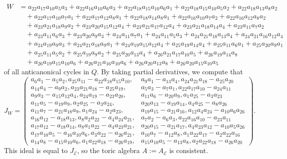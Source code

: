 \documentclass[11pt,a4paper]{amsart}
\numberwithin{equation}{section}
\theoremstyle{definition}
\theoremstyle{remark}
\begin{document}
\begin{align*}
W&=a_{22}a_{17}a_{10}a_{5}a_3 + a_{22}a_{16}a_{10}a_{6}a_3 +a_{22}a_{18}a_{15}a_{10}a_6a_1+a_{22}a_{18}a_{15}a_{10}a_5a_2+ a_{22}a_{18}a_{13}a_{8}a_2 \\
& \quad+a_{22}a_{17}a_{10}a_{7}a_{1} + a_{22}a_{17}a_{12}a_{8}a_1 +a_{22}a_{18}a_{14}a_{8}a_1 + a_{22}a_{16}a_{10}a_{7}a_2 +a_{22}a_{16}a_{12}a_{8}a_2  \\ 
& \quad+ a_{23}a_{21}a_{18}a_{9}a_2 + a_{23}a_{20}a_{15}a_{12}a_4+ a_{23}a_{21}a_{17}a_{12}a_4 + a_{23}a_{21}a_{18}a_{14}a_4 + a_{23}a_{11}a_{7}a_{2} \\
& \quad+ a_{23}a_{11}a_{6}a_{3} + a_{23}a_{20}a_{9}a_{3}  + a_{24}a_{11}a_{7}a_{1} +a_{24}a_{11}a_{5}a_{3}+a_{24}a_{21}a_{18}a_{13}a_4  +a_{24}a_{21}a_{16}a_{12}a_4 \\ 
&  \quad + a_{24}a_{19}a_{9}a_{3} + a_{24}a_{21}a_{18}a_{9}a_1 + a_{24}a_{19}a_{15}a_{12}a_4+ a_{25}a_{19}a_{14}a_{4} + a_{25}a_{11}a_{6}a_{1} + a_{25}a_{20}a_{9}a_{1}  \\
 & \quad  + a_{25}a_{11}a_{5}a_{2} + a_{25}a_{19}a_{9}a_{2} + a_{25}a_{20}a_{13}a_{4} + a_{26}a_{21}a_{17}a_{10}a_5 + a_{26}a_{19}a_{14}a_{8}  \\
& \quad + a_{26}a_{19}a_{15}a_{10}a_6 + a_{26}a_{21}a_{16}a_{10}a_6 + a_{26}a_{20}a_{13}a_{8} + a_{26}a_{20}a_{15}a_{10}a_5
\end{align*}
of all anticanonical cycles in $Q$. By taking partial derivatives, we compute that
    \[
  J_W=\left(\begin{array}{rl} 
  a_6a_1-a_5a_2, a_{25}a_{11} - a_{22}a_{18}a_{15}a_{10}, & a_9a_1 - a_{13}a_4, a_{24}a_{21}a_{18} - a_{25}a_{20} \\
  a_{14}a_{4} - a_9a_2, a_{23}a_{21}a_{18} - a_{25}a_{19},  & a_5a_3-a_7a_1, a_{22}a_{17}a_{10} - a_{24}a_{11} \\
  a_{9}a_3 - a_{15} a_{12}a_{4}, a_{24}a_{19} - a_{23}a_{20}, &  a_{11}a_{6} - a_{20}a_{9}, a_{1}a_{25} - a_3a_{23}\\
  a_{11}a_{5} - a_{19}a_{9}, a_2a_{25} - a_3a_{24}, & a_{20}a_{13} - a_{19} a_{14}, a_4a_{25}-a_8a_{26} \\
  a_{11}a_{7} - a_{21}a_{18}a_{9}, a_1a_{24} - a_2a_{23}, & a_{19}a_{15} - a_{21}a_{16}, a_{12}a_{4}a_{24} - a_{10}a_{6}a_{26} \\
  a_{16}a_{12} - a_{18}a_{13}, a_{8}a_2a_{22} - a_4a_{24}a_{21},&  a_7a_2 - a_6a_3, a_{22}a_{16}a_{10}-a_{23}a_{11} \\
  a_{17}a_{12} - a_{18}a_{14}, a_8a_1a_{22} - a_4a_{23}a_{21}, & a_{20}a_{15} - a_{21}a_{17}, a_4a_{23}a_{12} - a_{10}a_5a_{26} \\
  a_{17}a_{10}a_{5} - a_{16}a_{10}a_{6}, a_3a_{22} - a_{26}a_{21}, & a_{10}a_{7}-a_{12}a_{8}, a_1a_{22}a_{17} - a_2a_{22}a_{16} \\ 
  a_{14}a_{8} - a_{15}a_{10}a_{6}, a_1a_{22}a_{18} - a_{26}a_{19}, & a_{15}a_{10}a_{5} - a_{13}a_{8}, a_2a_{22}a_{18} - a_{26}a_{20}
    \end{array}\right).
 \]
 This ideal is equal to $J_{\mathscr{E}}$, so the toric algebra $A:=A_\mathscr{E}$ is consistent. 
\end{document}
